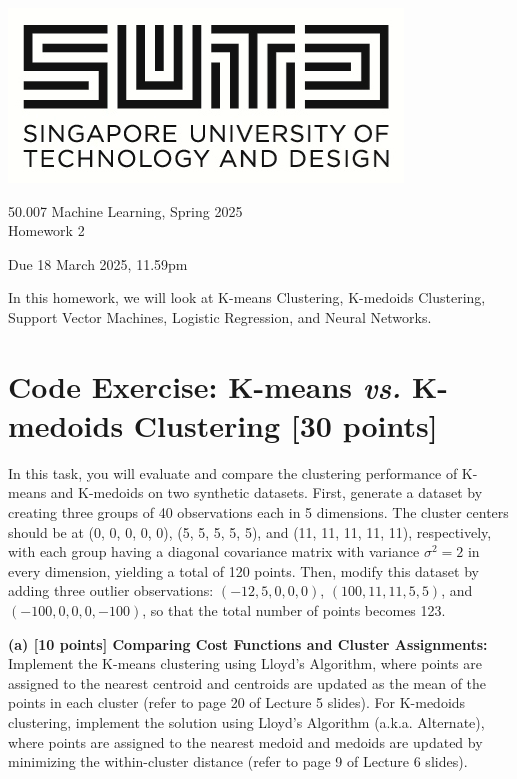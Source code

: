 \documentclass[11pt]{article}
\begin{document}
\begin{center}
\includegraphics[scale=0.25]{sutd.png}
\end{center}


\begin{center}
{{50.007 Machine Learning, Spring 2025\\Homework 2}}
\end{center}

\begin{center}
	{\small Due 18 March 2025, 11.59pm}
\end{center}


In this homework, we will look at K-means Clustering, K-medoids Clustering, Support Vector Machines, Logistic Regression, and Neural Networks.

\section{Code Exercise: K-means \textit{vs.} K-medoids Clustering [30 points]}

In this task, you will evaluate and compare the clustering performance of K-means and K-medoids on two synthetic datasets. First, generate a dataset by creating three groups of 40 observations each in 5 dimensions. The cluster centers should be at (0, 0, 0, 0, 0), (5, 5, 5, 5, 5), and (11, 11, 11, 11, 11), respectively, with each group having a diagonal covariance matrix with variance $\sigma^2 = 2$ in every dimension, yielding a total of 120 points. Then, modify this dataset by adding three outlier observations: $(-12, 5, 0, 0, 0)$, $(100, 11, 11, 5, 5)$, and $(-100, 0, 0, 0, -100)$, so that the total number of points becomes 123.

\vspace{0.1in}
\noindent\textbf{(a) [10 points] Comparing Cost Functions and Cluster Assignments:} 
Implement the K-means clustering using Lloyd’s Algorithm, where points are assigned to the nearest centroid and centroids are updated as the mean of the points in each cluster (refer to page 20 of Lecture 5 slides). For K-medoids clustering, implement the solution using Lloyd’s Algorithm (a.k.a. Alternate), where points are assigned to the nearest medoid and medoids are updated by minimizing the within-cluster distance (refer to page 9 of Lecture 6 slides).
\end{document}
